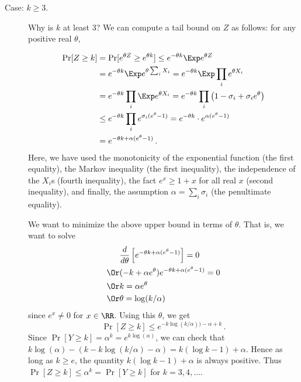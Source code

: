     \begin{description}
        \item[Case: $k \geq 3$.]
        {\color{red} Why is $k$ at least $3$?} 
        We can compute a tail bound on $Z$ as follows: 
        for any positive real $\theta$, 

        \begin{align*}
            \Pr[Z \geq k] 
            &= \Pr[e^{\theta Z} \geq e^{\theta k}] \leq e^{-\theta k} \Exp e^{\theta Z} \\
            &=  e^{-\theta k} \Exp e^{\theta \sum_i X_i} =  e^{-\theta k}\Exp \prod_i e^{\theta X_i} \\
            &=  e^{-\theta k} \prod_i \Exp e^{\theta X_i} 
            =  e^{-\theta k} \prod_i \left(1 - \sigma_i + \sigma_i e^{\theta }\right) \\
            &\leq e^{-\theta k} \prod_i e^{\sigma_i(e^\theta - 1)} = e^{- \theta k} \cdot e^{ \alpha (e^\theta - 1)} \\
            &= e^{- \theta k + \alpha ( e^\theta - 1)}
            \,.
        \end{align*}
        Here, we have used 
        the monotonicity of the exponential function (the first equality),
        the Markov inequality (the first inequality), 
        the independence of the $X_i$s (fourth inequality), 
        the fact $e^x \geq 1 + x$ for all real $x$ (second inequality), 
        and finally, the assumption $\alpha = \sum_i \sigma_i$ (the penultimate equality).

        We want to minimize the above upper bound in terms of $\theta$. 
        That is, we want to solve 
        \begin{align*}
                    &\dfrac{d}{d\theta} \left[ e^{- \theta k + \alpha (e^\theta - 1)} \right]= 0 \\
            \Or&    (-k + \alpha e^\theta) e^{- \theta k + \alpha (e^\theta - 1)} = 0 \\
            \Or& k = \alpha e^\theta \\
            \Or& \theta = \log(k/\alpha)
        \end{align*}
        since $e^x \neq 0$ for $x \in \RR$. 
        Using this $\theta$, we get
        \begin{equation}\label{eq:Z_tail}
            \Pr[Z \geq k] \leq e^{- k \log(k/\alpha) ) - \alpha + k} 
            \,.
        \end{equation}
        Since $\Pr[Y \geq k] = \alpha^k = e^{k \log(\alpha)}$, we can check that 
        $k \log(\alpha) - \left( k  - k \log(k/\alpha)  - \alpha \right)
        = k (\log k - 1) + \alpha
        $.
        Hence as long as $k \geq e$, 
        the quantity $k (\log k - 1) + \alpha$ is always positive. 
        Thus $\Pr[Z \geq k] \leq \alpha^k = \Pr[Y \geq k]$ for $k = 3, 4, \ldots$.



\end{description}
